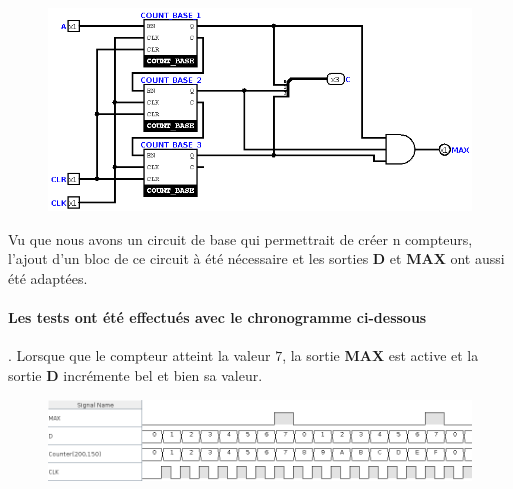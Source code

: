\documentclass[a4paper]{article} %
\begin{document}
\begin{tcolorbox}[colframe=Monokaimagenta,colback=white]

\begin{figure}[H]
\centering
    \includegraphics[width=1\textwidth]{src/COUNT_8BITS.png}
    \label{fig:count4bits}
\end{figure}

Vu que nous avons un circuit de base qui permettrait de créer n compteurs, l'ajout d'un bloc de ce circuit à été nécessaire et les sorties \textbf{D} et \textbf{MAX} ont aussi été adaptées.

\paragraph{Les tests ont été effectués avec le chronogramme ci-dessous}. Lorsque que le compteur atteint la valeur $7$, la sortie \textbf{MAX} est active et la sortie \textbf{D} incrémente bel et bien sa valeur.
\begin{figure}[H]
\centering
    \includegraphics[width=1\textwidth]{src/chrono_COUNT_8.png}
    \label{fig:count8bits}
\end{figure}

\end{tcolorbox}
\pagebreak
\end{document}
